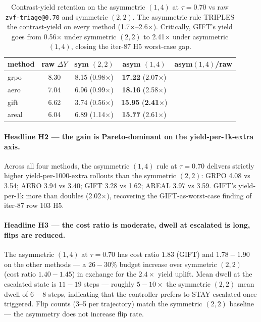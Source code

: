 \documentclass{article}
\begin{document}
\begin{table}[h]
\centering\small
\begin{tabular}{lcccc}
\toprule
method & raw $\Delta Y$ & sym $(2,2)$ & asym $(1,4)$ & asym$(1,4)$/raw \\
\midrule
grpo   & 8.30  & 8.15 (0.98$\times$) & \textbf{17.22} (2.07$\times$) \\
aero   & 7.04  & 6.96 (0.99$\times$) & \textbf{18.16} (2.58$\times$) \\
gift   & 6.62  & 3.74 (0.56$\times$) & \textbf{15.95} (\textbf{2.41$\times$}) \\
areal  & 6.04  & 6.89 (1.14$\times$) & \textbf{15.77} (2.61$\times$) \\
\bottomrule
\end{tabular}
\caption{Contrast-yield retention on the asymmetric $(1,4)$ at
$\tau{=}0.70$ vs raw \texttt{zvf-triage@0.70} and symmetric
$(2,2)$. The asymmetric rule TRIPLES the contrast-yield on
every method (1.7$\times$--2.6$\times$).  Critically, GIFT's
yield goes from 0.56$\times$ under symmetric $(2,2)$ to
2.41$\times$ under asymmetric $(1,4)$, closing the
iter-87 H5 worst-case gap.}
\label{tab:p7-asym-1-4}
\end{table}

\paragraph{Headline H2 --- the gain is Pareto-dominant on the
yield-per-1k-extra axis.}
Across all four methods, the asymmetric $(1,4)$ rule at
$\tau{=}0.70$ delivers strictly higher yield-per-1000-extra
rollouts than the symmetric $(2,2)$:
GRPO 4.08 vs 3.54; AERO 3.94 vs 3.40; GIFT 3.28 vs 1.62;
AREAL 3.97 vs 3.59.  GIFT's yield-per-1k more than doubles
(2.02$\times$), recovering the GIFT-as-worst-case finding of
iter-87 row 103 H5.

\paragraph{Headline H3 --- the cost ratio is moderate, dwell at
escalated is long, flips are reduced.}
The asymmetric $(1,4)$ at $\tau{=}0.70$ has cost ratio $1.83$
(GIFT) and $1.78{-}1.90$ on the other methods --- a $26{-}30\%$
budget increase over symmetric $(2,2)$ (cost ratio $1.40{-}1.45$)
in exchange for the $2.4\times$ yield uplift.  Mean dwell at the
escalated state is $11{-}19$ steps --- roughly $5{-}10\times$ the
symmetric $(2,2)$ mean dwell of $6{-}8$ steps, indicating that
the controller prefers to STAY escalated once triggered.  Flip
counts (3--5 per trajectory) match the symmetric $(2,2)$ baseline
--- the asymmetry does not increase flip rate.
\end{document}
